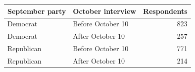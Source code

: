\begin{tabular}{llr}
\toprule
September party & October interview & Respondents \\
\midrule
Democrat & Before October 10 & 823 \\
Democrat & After October 10 & 257 \\
Republican & Before October 10 & 771 \\
Republican & After October 10 & 214 \\
\bottomrule
\end{tabular}

